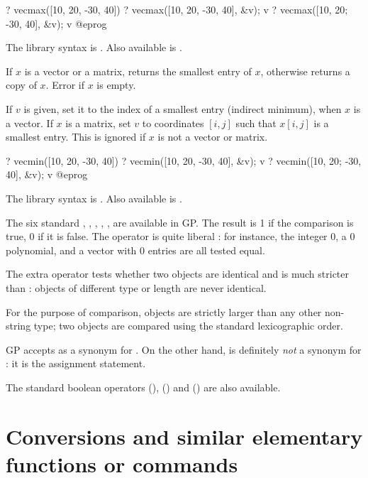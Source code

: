 \bprog
? vecmax([10, 20, -30, 40])
? vecmax([10, 20, -30, 40], &v); v
? vecmax([10, 20; -30, 40], &v); v
@eprog

The library syntax is .
Also available is .

\label{se:vecmin}
If $x$ is a vector or a matrix, returns the smallest entry of $x$,
otherwise returns a copy of $x$. Error if $x$ is empty.

If $v$ is given, set it to the index of a smallest entry (indirect minimum),
when $x$ is a vector. If $x$ is a matrix, set $v$ to coordinates $[i,j]$ such
that $x[i,j]$ is a smallest entry. This is ignored if $x$ is not a vector or
matrix.

\bprog
? vecmin([10, 20, -30, 40])
? vecmin([10, 20, -30, 40], &v); v
? vecmin([10, 20; -30, 40], &v); v
@eprog

The library syntax is .
Also available is .

 The six
standard  \kbd{<=}, \kbd{<}, \kbd{>=}, \kbd{>},
\kbd{==}, \kbd{!=} are available in GP. The result is 1 if the comparison is
true, 0 if it is false. The operator \kbd{==} is quite liberal : for
instance, the integer 0, a 0 polynomial, and a vector with 0 entries are all
tested equal.

The extra operator \kbd{===} tests whether two objects are identical and is
much stricter than \kbd{==} : objects of different type or length are never
identical.

For the purpose of comparison,  objects are strictly larger than any
other non-string type; two  objects are compared using the standard
lexicographic order.

GP accepts \kbd{<>} as a synonym for \kbd{!=}. On the other hand, \kbd{=} is
definitely \emph{not} a synonym for \kbd{==}: it is the assignment statement.

The standard boolean operators \kbd{||} (), \kbd{\&\&}
() and \kbd{!} () are also available.

\section{Conversions and similar elementary functions or commands}
\label{se:conversion}

